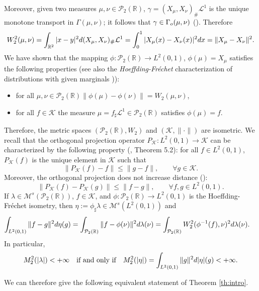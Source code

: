 \documentclass[12pt,a4paper]{article}
\newcommand{\R}{\mathbb{R}}
\renewcommand{\P}{\mathcal{P}}
\renewcommand{\d}{{\rm d}}
\newcommand{\K}{\mathcal{K}}
\theoremstyle{plain}
\theoremstyle{definition}
\begin{document}
Moreover, given two measures $\mu, \nu \in \P_2(\R)$, $\gamma = (X_\mu, X_\nu)_\# \mathcal{L}^1$ is the unique monotone transport in $\Gamma(\mu,\nu)$; it follows that $\gamma \in \Gamma_{\rm o}(\mu, \nu)$ (\cite[Theorem 2.9]{santambrogio}).
Therefore
\begin{equation}
\label{eq:hoeffding}
    W_2^2(\mu,\nu) = \int_{\R^2} |x-y|^2 \d (X_\mu, X_\nu)_\# \mathcal{L}^1 = \int_0^1 |X_\mu(x) - X_\nu(x)|^2 \d x = \|X_\mu - X_\nu \|^2.
\end{equation}
We have shown that the mapping $\phi: \P_2(\R)\to L^2(0,1)$, $\phi(\mu)=X_\mu$ satisfies the following properties (see also the \emph{Hoeffding-Fr\'echet} characterization of distributions with given marginals \cite[Sec. 3.1]{Rachev})):\begin{itemize}
	\item[(i)] for all $\mu,\nu \in \P_2(\R)$\quad  $\|\phi(\mu)-\phi(\nu)\|=W_2(\mu,\nu)$,
	\item[(ii)] for all $f \in \K$ the measure $\mu = f_\sharp \mathcal{L}^1 \in \P_2(\R)$ satisfies $\phi(\mu)=f$.
\end{itemize}	
Therefore, the metric spaces $\left( \P_2(\R),W_2\right)$ and $\left( \K,\| \cdot \|\right)$ are isometric. We recall that the orthogonal projection operator $P_\K:L^2(0,1) \to \K$ can be characterized by the following property (\cite{brezis}, Theorem 5.2): for all $f\in L^2(0,1)$, $P_\K(f)$ is the unique element in $\K$ such that
\begin{equation}
\label{eq:proj}
	\|P_\K(f)-f\|\leq \|g-f\|,\qquad \forall g\in \K.
\end{equation}  
Moreover, the orthogonal projection does not increase distance (\cite[Proposition 5.3]{brezis}):
\begin{equation}
\label{eq:nonexp}
	\|P_\K(f)-P_\K(g) \|\leq \|f-g\|,\qquad \forall f,g \in L^2(0,1).
\end{equation}
If $\lambda \in \mathcal M^s(\P_2(\R))$, $f\in \mathcal K$, and $\phi: \P_2(\R)\to L^2(0,1)$ is the Hoeffding-Fr\'echet isometry,  then $\eta:=\phi_\sharp \lambda \in \mathcal M^s(L^2(0,1))$ and
\begin{align*}
	\int_{L^2(0,1)}  \|f-g\|^2\d\eta(g) & = \int_{\P_2(\R)} \|f-\phi(\nu)\|^2\d\lambda(\nu) =\int_{\P_2(\R)} W_2^2(\phi^{-1}(f),\nu)^2\d\lambda(\nu).
\end{align*}  
In particular, 
\[
	M_2^2(|\lambda|)<+\infty\quad \text{if and only if}\quad M_2^2(|\eta |) = \int_{L^2(0,1)} \|g\|^2\d|\eta|(g) <+\infty.
\]

We can therefore give the following equivalent statement of Theorem \ref{th:intro}. %
\end{document}
